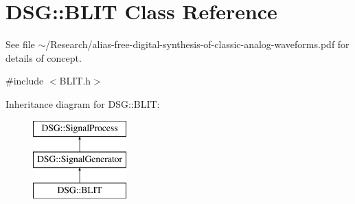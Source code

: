 \hypertarget{classDSG_1_1BLIT}{\section{D\+S\+G\+:\+:B\+L\+I\+T Class Reference}
\label{classDSG_1_1BLIT}
}


See file $\sim$/\+Research/alias-\/free-\/digital-\/synthesis-\/of-\/classic-\/analog-\/waveforms.pdf for details of concept.  




{\ttfamily \#include $<$B\+L\+I\+T.\+h$>$}

Inheritance diagram for D\+S\+G\+:\+:B\+L\+I\+T\+:\begin{figure}[H]
\begin{center}
\leavevmode
\includegraphics[height=3.000000cm]{classDSG_1_1BLIT}
\end{center}
\end{figure}

